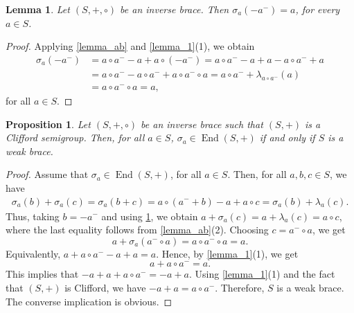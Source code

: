 \documentclass[preprint,1p]{elsarticle}
\newtheorem{prop}[theor]{Proposition}
\newtheorem{lemma}[theor]{Lemma}
\theoremstyle{definition}               %
\DeclareMathOperator{\End}{End}
\begin{document}
\begin{lemma}\label{lemma_ameno}
    Let $(S, +, \circ)$ be an inverse brace. Then $\sigma_a\left(-a^-\right)=a$, for every $a \in S$.
\end{lemma} 
\begin{proof}
Applying \cref{lemma_ab} and \cref{lemma_1}(1), we obtain
\begin{align*}
    \sigma_a\left(-a^-\right)&%
    =a\circ a^- -a+ a\circ (-a^-)= a\circ a^--a+a-a \circ a^-+a\\
    &=a\circ a^- -a\circ a^-+a\circ a^- \circ a= a\circ a^- +\lambda_{a\circ a^-}(a)\\  
    &=a \circ a^- \circ a=a,
\end{align*}
for all $a \in S$.
\end{proof}

\smallskip

\begin{prop}
    Let $(S, +, \circ)$ be an inverse brace such that $(S, +)$ is a Clifford semigroup. 
    Then, for all $a \in S$, $\sigma_a \in \End(S, +)$ if and only if $S$ is a weak brace.
\end{prop}
\begin{proof}
    Assume that $\sigma_a \in \End(S, +)$, for all $a \in S$. Then, for all $a,b,c \in S$, we have \begin{align*} \sigma_a(b)+\sigma_a(c)=\sigma_a(b+c)=a \circ \left(a^-+b\right) -a + a \circ c=\sigma_a(b)+\lambda_a(c).
    \end{align*}
Thus, taking $b=-a^-$ and using \cref{lemma_ameno}, we obtain $a +\sigma_a(c)= a+\lambda_a(c)=a\circ c$, where the last equality follows from \cref{lemma_ab}(2).
     Choosing $c=a^- \circ a$, we get $$a+\sigma_a\left(a^- \circ a\right)=a \circ a^- \circ a=a.$$  Equivalently, $a+a \circ a^--a+a =a$. Hence, by \cref{lemma_1}(1), we get
     $$a+a \circ a^-=a.$$ 
     This implies that $-a+a+a \circ a^-=-a+a$.
     Using \cref{lemma_1}(1) and the fact that $(S, +)$ is Clifford, we have $-a+a=a \circ a^-$. Therefore, $S$ is a weak brace.\\
     The converse implication is obvious.
\end{proof}
\end{document}
